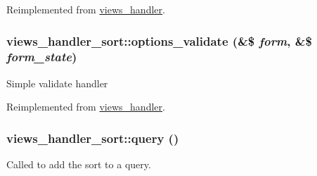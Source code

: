 Reimplemented from \hyperlink{classviews__handler_abb55e97dbb1e634b95a1cc9ea836d6e8}{views\_\-handler}.\hypertarget{classviews__handler__sort_add9d1acdd648e984ca380cc3c1c092d5}{
\subsubsection[{options\_\-validate}]{\setlength{\rightskip}{0pt plus 5cm}views\_\-handler\_\-sort::options\_\-validate (\&\$ {\em form}, \/  \&\$ {\em form\_\-state})}}
\label{classviews__handler__sort_add9d1acdd648e984ca380cc3c1c092d5}
Simple validate handler 

Reimplemented from \hyperlink{classviews__handler_a831c00b8cd3c667e25db014a3413273c}{views\_\-handler}.\hypertarget{classviews__handler__sort_a94fa33c5d037e41a927583fce2df3d18}{
\subsubsection[{query}]{\setlength{\rightskip}{0pt plus 5cm}views\_\-handler\_\-sort::query ()}}
\label{classviews__handler__sort_a94fa33c5d037e41a927583fce2df3d18}
Called to add the sort to a query. 

